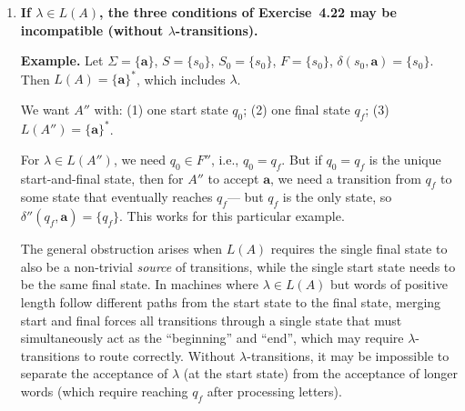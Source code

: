 \begin{enumerate}[{4.}1.]
\textbf{Construction.}  Let $A=\langle\Sigma,S,S_0,\delta,F\rangle$ with
$\lambda\notin L(A)$ (i.e., $S_0\cap F=\emptyset$).
\begin{enumerate}[1.]
  \item Add a new start state $q_0$ and a new final state $q_f$.
  \item For all $\pmb{a}\in\Sigma$:
        $\delta''(q_0,\pmb{a})=\bigcup_{s\in S_0}\delta(s,\pmb{a})$.
        (Simulate starting from any state in $S_0$.)
  \item For all $s\in S$ and $\pmb{a}\in\Sigma$:
        $\delta''(s,\pmb{a})=\delta(s,\pmb{a})$.
  \item For all $f\in F$: whenever $f$ would be in $\delta''(s,\pmb{a})$
        for some $s,\pmb{a}$, also add $q_f$ to $\delta''(s,\pmb{a})$.
        (That is, $q_f$ behaves like a ``copy'' of states in $F$:
        $\delta''(s,\pmb{a})=(\delta(s,\pmb{a})\setminus F)\cup\{q_f\mid\delta(s,\pmb{a})\cap F\neq\emptyset\}$.)
  \item $\delta''(q_f,\pmb{a})=\emptyset$ for all $\pmb{a}$.
\end{enumerate}
The new machine $A''$ has start state $q_0$, final state $\{q_f\}$, and
accepts a word $w=\pmb{a}_1\cdots\pmb{a}_k$ ($k\ge 1$) iff $A$ accepts $w$.
Since $\lambda\notin L(A)$, we need $S_0\cap F=\emptyset$, ensuring $q_0$ need
not be final.

\item \textbf{If $\lambda\in L(A)$, the three conditions of Exercise~4.22
may be incompatible (without $\lambda$-transitions).}

\textbf{Example.}  Let $\Sigma=\{\pmb{a}\}$, $S=\{s_0\}$, $S_0=\{s_0\}$,
$F=\{s_0\}$, $\delta(s_0,\pmb{a})=\{s_0\}$.  Then $L(A)=\{\pmb{a}\}^*$, which
includes $\lambda$.

We want $A''$ with: (1) one start state $q_0$; (2) one final state $q_f$; (3)
$L(A'')=\{\pmb{a}\}^*$.

For $\lambda\in L(A'')$, we need $q_0\in F''$, i.e., $q_0=q_f$.  But if
$q_0=q_f$ is the unique start-and-final state, then for $A''$ to accept $\pmb{a}$,
we need a transition from $q_f$ to some state that eventually reaches $q_f$---
but $q_f$ is the only state, so $\delta''(q_f,\pmb{a})=\{q_f\}$.  This works
for this particular example.

The general obstruction arises when $L(A)$ requires the single final state to
also be a non-trivial \emph{source} of transitions, while the single start state
needs to be the same final state.  In machines where $\lambda\in L(A)$ but
words of positive length follow different paths from the start state to
the final state, merging start and final forces all transitions through a single
state that must simultaneously act as the ``beginning'' and ``end'', which may
require $\lambda$-transitions to route correctly.  Without $\lambda$-transitions,
it may be impossible to separate the acceptance of $\lambda$ (at the start
state) from the acceptance of longer words (which require reaching $q_f$ after
processing letters).


\end{enumerate}
